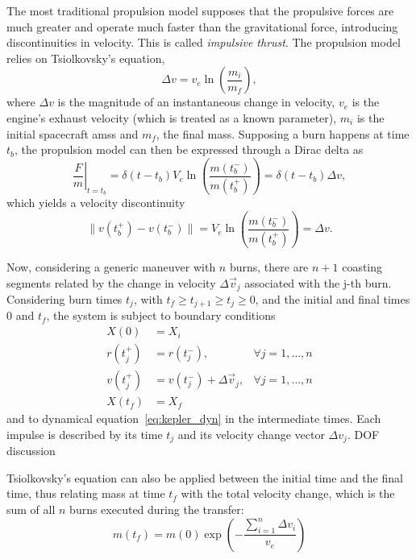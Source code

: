 The most traditional propulsion model supposes that the propulsive forces are much greater and operate much faster than the gravitational force, introducing discontinuities in velocity. This is called \textit{impulsive thrust}. The propulsion model relies on Tsiolkovsky's equation, 
\begin{equation}
    \Delta v = v_e \ln{\left(\frac{m_i}{m_f}\right)},
\end{equation}
where \(\Delta v\) is the magnitude of an instantaneous change in velocity, \(v_e\) is the engine's exhaust velocity (which is treated as a known parameter), \(m_i\) is the initial spacecraft amss and \(m_f\), the final mass. Supposing a burn happens at time \(t_b\), the propulsion model can then be expressed through a Dirac delta as
\begin{equation}
    \left.\frac{F}{m}\right\vert_{t = t_b} = \delta(t - t_b) V_e \ln{\left(\frac{m(t_b^-)}{m(t_b^+)} \right)} = \delta(t - t_b) \Delta v,
\end{equation}
which yields a velocity discontinuity
\begin{equation}
    \lVert v(t_b^+) - v(t_b^-) \rVert = V_e \ln{\left(\frac{m(t_b^-)}{m(t_b^+)}\right)} = \Delta v.
\end{equation}

Now, considering a generic maneuver with \(n\) burns, there are \(n+1\) coasting segments related by the change in velocity \(\Delta \vec v_j\) associated with the j-th burn. Considering burn times \(t_j\), with \(t_f \geq t_{j+1} \geq t_j \geq 0\), and the initial and final times \(0\) and \(t_f\), the system is subject to boundary conditions
\begin{align}
    X(0) &= X_i \\
    r(t_j^+) &= r(t_j^-),& \forall j=1,\dots,n \\
    v(t_j^+) &= v(t_j^-) + \Delta \vec v_j,& \forall j=1,\dots,n \\
    X(t_f) &= X_f
\end{align}
and to dynamical equation~\eqref{eq:kepler_dyn} in the intermediate times. Each impulse is described by its time \(t_j\) and its velocity change vector \(\Delta v_j\). DOF discussion


Tsiolkovsky's equation can also be applied between the initial time and the final time, thus relating mass at time \(t_f\) with the total velocity change, which is the sum of all \(n\) burns executed during the transfer:
\begin{equation}
    m(t_f) = m(0) \exp{\left(-\frac{\sum_{i=1}^{n}\Delta v_i}{v_e}\right)}
\end{equation}

